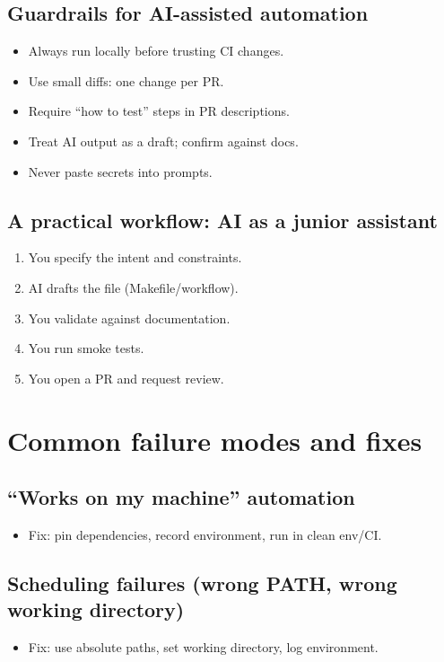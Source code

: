 \subsection{Guardrails for AI-assisted automation}
\begin{itemize}
\item Always run locally before trusting CI changes.
\item Use small diffs: one change per PR.
\item Require ``how to test'' steps in PR descriptions.
\item Treat AI output as a draft; confirm against docs.
\item Never paste secrets into prompts.
\end{itemize}

\subsection{A practical workflow: AI as a junior assistant}
\begin{enumerate}
\item You specify the intent and constraints.
\item AI drafts the file (Makefile/workflow).
\item You validate against documentation.
\item You run smoke tests.
\item You open a PR and request review.
\end{enumerate}

\section{Common failure modes and fixes}
\subsection{``Works on my machine'' automation}
\begin{itemize}
\item Fix: pin dependencies, record environment, run in clean env/CI.
\end{itemize}

\subsection{Scheduling failures (wrong PATH, wrong working directory)}
\begin{itemize}
\item Fix: use absolute paths, set working directory, log environment.
\end{itemize}

